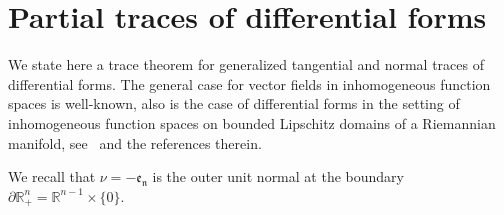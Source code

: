 \documentclass[10pt]{amsart}
\theoremstyle{definition}\newtheorem{defi}[theo]{Definition}\newtheorem{rema}[theo]{Remark}\newtheorem{exam}[theo]{Example}\newtheorem{exem}[theo]{Example}\newtheorem{nota}[theo]{Notation}
\newcommand{\bbR}{\mathbb{R}}
\begin{document}
\appendix

\section{Partial traces of differential forms}\label{Append:TracesofFunctions}

We state here a trace theorem for generalized tangential and normal traces of differential forms. The general case for vector fields in inhomogeneous function spaces is well-known, also is the case of differential forms in the setting of inhomogeneous function spaces on bounded Lipschitz domains of a Riemannian manifold, see~\cite[Section~4]{MitreaMitreaShaw2008} and the references therein.


We recall that $\nu=-\mathfrak{e_n}$ is the outer unit normal at the boundary $\partial\bbR^n_+=\bbR^{n-1}\times\{0\}$.
\end{document}
